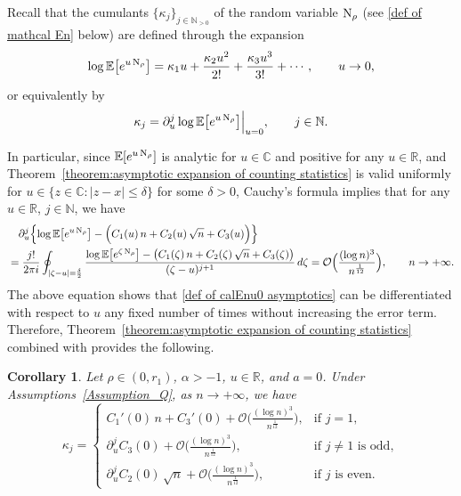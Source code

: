 \documentclass[reqno]{amsart}
\newcommand{\1}{\mathds{1}}
\newcommand{\C}{\mathds{C}}
\newcommand{\N}{\mathbb{N}}
\newcommand{\R}{\mathds{R}}
\newcommand{\re}{\text{\upshape Re\,}}
\newcommand{\im}{\text{\upshape Im\,}}
\numberwithin{equation}{section}
\newtheorem{corollary}[theorem]{Corollary}
\theoremstyle{definition}
\begin{document}
Recall that the cumulants $\{\kappa_j\}_{j\in\mathbb{N}_{>0}}$ of the random variable ${\rm N}_{\rho}$ (see \eqref{def of mathcal En} below) are defined through the expansion 
\[
\log \mathbb{E}\bigl[e^{u\,{\rm N}_{\rho}}\bigr]
=
\kappa_1u+\frac{\kappa_2u^2}{2!}+\frac{\kappa_3u^3}{3!}+\cdots,\qquad u\to 0,
\]
or equivalently by
\begin{equation}
\label{def of cumulant}
\kappa_j=\partial_u^j\log \mathbb{E}\bigl[e^{u\,{\rm N}_{\rho}}\bigr]\Bigr|_{u=0},\qquad j\in\N.
\end{equation} 

In particular, since $\mathbb{E}[e^{u\,{\rm N}_{\rho}}]$ is analytic for $u\in\C$ and positive for any $u\in\R$, and Theorem~\ref{theorem:asymptotic expansion of counting statistics} is valid uniformly for $u\in\{z\in\C:|z-x|\leq \delta\}$ for some $\delta>0$,  Cauchy's formula implies that for any $u\in\R$, $j\in\N$, we have 
\begin{align*}
&\quad
\partial_u^{j}\Bigl\{\log \mathbb{E}\bigl[e^{u\,{\rm N}_{\rho}}\bigr]-\Bigl(C_1(u)\,n+C_2(u)\,\sqrt{n}+C_3(u)\Bigr)\Bigr\}
\\
&=
\frac{j!}{2\pi i}\oint_{|\zeta-u|=\frac{\delta}{2}}
\frac{\log \mathbb{E}\bigl[e^{\zeta\,{\rm N}_{\rho}}\bigr]-\bigl(C_1(\zeta)\,n+C_2(\zeta)\,\sqrt{n}+C_3(\zeta)\bigr)}{(\zeta-u)^{j+1}}\,d\zeta
=\mathcal{O}\Bigl(\frac{(\log n)^3}{n^{\frac{1}{12}}}\Bigr),\qquad
n\to+\infty.
\end{align*}
The above equation shows that \eqref{def of calEnu0 asymptotics} can be differentiated with respect to $u$ any fixed number of times without increasing the error term.  
Therefore, Theorem~\ref{theorem:asymptotic expansion of counting statistics} combined with \cite[Proof of Corollary 1.6]{C2021 FH} provides the following.

\begin{corollary}
\label{corollary:cumulant of counting statistics}  
Let $\rho\in(0,r_1)$, $\alpha>-1$, $u\in\R$, and $a=0$. 
Under Assumptions~\ref{Assumption_Q}, as $n\to+\infty$, we have 
\begin{equation}
\kappa_j=\begin{cases}
C_1'(0)\,n+C_3'(0)+\mathcal{O}\bigl(\frac{(\log n)^3}{n^{\frac{1}{12}}}\bigr),    & \mbox{if } j=1, \\
\partial_u^jC_3(0)+\mathcal{O}\bigl(\frac{(\log n)^3}{n^{\frac{1}{12}}}\bigr),    & \mbox{if } \text{$j\neq 1$ is odd}, \\
\partial_u^jC_2(0)\,\sqrt{n}+\mathcal{O}\bigl(\frac{(\log n)^3}{n^{\frac{1}{12}}}\bigr),     & \mbox{if } \text{$j$ is even}.
\end{cases}    
\end{equation}
\end{corollary}
\end{document}
